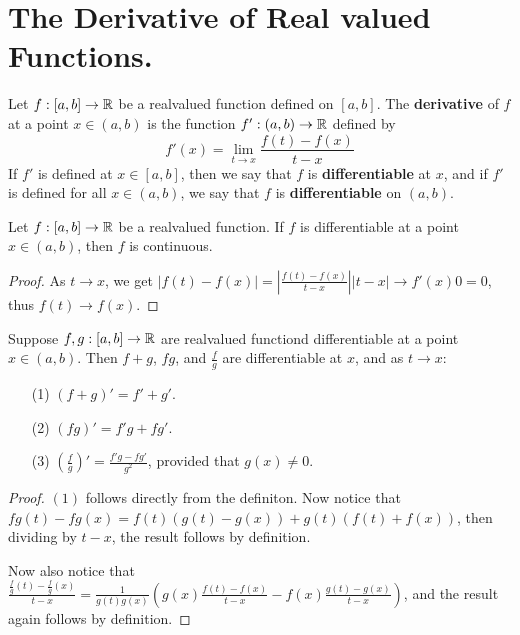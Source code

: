 
\section{The Derivative of Real valued Functions.}

\begin{definition}
    Let $f:[a,b] \rightarrow \mathbb{R}$ be a realvalued function defined on  $[a,b]$. The \textbf{derivative}
    of $f$ at a point  $x \in (a,b)$ is the function $f':(a,b) \rightarrow \mathbb{R}$ defined by
        \begin{equation}
            f'(x)=\lim_{t \rightarrow x}{\frac{f(t)-f(x)}{t-x}}
        \end{equation}
        If $f'$ is defined at $x \in [a,b]$, then we say that $f$ is \textbf{differentiable} at $x$,
        and if $f'$ is  defined for all $x \in (a,b)$, we say that $f$ is \textbf{differentiable}
        on $(a,b)$.
\end{definition}

\begin{theorem}\label{6.1.1}
    Let $f:[a,b] \rightarrow \mathbb{R}$ be a realvalued function. If  $f$ is differentiable at a point
    $x \in (a,b)$, then $f$ is continuous.
\end{theorem}
\begin{proof}
    As $t \rightarrow x$, we get $|f(t)-f(x)|=|\frac{f(t)-f(x)}{t-x}||t-x| \rightarrow f'(x)0=0$,
    thus $f(t) \rightarrow f(x)$.
\end{proof}

\begin{theorem}\label{6.1.2}
    Suppose $f,g:[a,b] \rightarrow  \mathbb{R}$ are realvalued functiond differentiable at a point
    $x \in (a,b)$. Then $f+g$,  $fg$, and  $ \frac{f}{g}$ are differentiable at $x$, and
    as $t \rightarrow x$:
        \begin{enumerate}
            \item[(1)] $(f+g)'=f'+g'$.

            \item[(2)] $(fg)'=f'g+fg'$.

            \item[(3)] $(\frac{f}{g})'=\frac{f'g-fg'}{g^2}$, provided that $g(x) \neq 0$.
        \end{enumerate}
\end{theorem}
\begin{proof}
    $(1)$ follows directly from the definiton. Now notice that $fg(t)-fg(x)=f(t)(g(t)-g(x))+
    g(t)(f(t)+f(x))$, then dividing by  $t-x$, the result follows by definition.

    Now also notice that $ \frac{\frac{f}{g}(t)-\frac{f}{g}(x)}{t-x}=\frac{1}{g(t)g(x)}
    (g(x)\frac{f(t)-f(x)}{t-x}-f(x)\frac{g(t)-g(x)}{t-x})$, and the result again follows by
    definition.
\end{proof}

